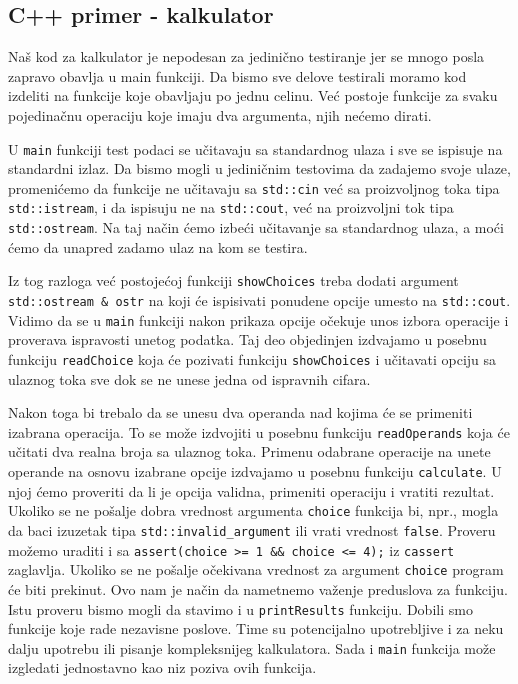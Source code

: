 \subsection{C++ primer - kalkulator}\label{c-primer---kalkulator}

Naš kod za kalkulator je nepodesan za jedinično testiranje jer se mnogo posla zapravo obavlja u main funkciji. Da bismo sve delove testirali moramo kod izdeliti na funkcije koje obavljaju po jednu celinu. Već postoje funkcije za svaku pojedinačnu operaciju koje imaju dva argumenta, njih nećemo dirati.

U \texttt{main} funkciji test podaci se učitavaju sa standardnog ulaza i sve se ispisuje na standardni izlaz. Da bismo mogli u jediničnim testovima da zadajemo svoje ulaze, promenićemo da funkcije ne učitavaju sa \texttt{std::cin} već sa proizvoljnog toka tipa \texttt{std::istream}, i da ispisuju ne na \texttt{std::cout}, već na proizvoljni tok tipa \texttt{std::ostream}. Na taj način ćemo izbeći učitavanje sa standardnog ulaza, a moći ćemo da unapred zadamo ulaz na kom se testira.

Iz tog razloga već postojećoj funkciji \texttt{showChoices} treba dodati argument \texttt{std::ostream\ \&\ ostr} na koji će ispisivati ponudene opcije umesto na \texttt{std::cout}. Vidimo da se u \texttt{main} funkciji nakon prikaza opcije očekuje unos izbora operacije i proverava ispravosti unetog podatka. Taj deo objedinjen izdvajamo u posebnu funkciju \texttt{readChoice} koja će pozivati funkciju \texttt{showChoices} i učitavati opciju sa ulaznog toka sve dok se ne unese jedna od ispravnih cifara.

Nakon toga bi trebalo da se unesu dva operanda nad kojima će se primeniti izabrana operacija. To se može izdvojiti u posebnu funkciju \texttt{readOperands} koja će učitati dva realna broja sa ulaznog toka. Primenu odabrane operacije na unete operande na osnovu izabrane opcije izdvajamo u posebnu funkciju \texttt{calculate}. U njoj ćemo proveriti da li je opcija validna, primeniti operaciju i vratiti rezultat. Ukoliko se ne pošalje dobra vrednost argumenta \texttt{choice} funkcija bi, npr., mogla da baci izuzetak tipa \texttt{std::invalid\_argument} ili vrati vrednost \texttt{false}. Proveru možemo uraditi i sa \texttt{assert(choice\ \textgreater{}=\ 1\ \&\&\ choice\ \textless{}=\ 4);} iz \texttt{cassert} zaglavlja. Ukoliko se ne pošalje očekivana vrednost za argument \texttt{choice} program će biti prekinut. Ovo nam je način da nametnemo važenje preduslova za funkciju. Istu proveru bismo mogli da stavimo i u \texttt{printResults} funkciju. Dobili smo funkcije koje rade nezavisne poslove. Time su potencijalno upotrebljive i za neku dalju upotrebu ili pisanje kompleksnijeg kalkulatora. Sada i \texttt{main} funkcija može izgledati jednostavno kao niz poziva ovih funkcija.

